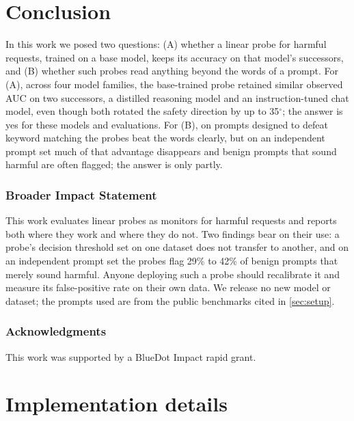 \documentclass[10pt]{article}
\begin{document}
\section{Conclusion}
\label{sec:conclusion}

In this work we posed two questions: (A) whether a linear probe for harmful requests, trained on a base model, keeps its accuracy on that model's successors, and (B) whether such probes read anything beyond the words of a prompt. For (A), across four model families, the base-trained probe retained similar observed AUC on two successors, a distilled reasoning model and an instruction-tuned chat model, even though both rotated the safety direction by up to 35$^\circ$; the answer is yes for these models and evaluations. For (B), on prompts designed to defeat keyword matching the probes beat the words clearly, but on an independent prompt set much of that advantage disappears and benign prompts that sound harmful are often flagged; the answer is only partly.

\subsubsection*{Broader Impact Statement}
This work evaluates linear probes as monitors for harmful requests and reports both where they work and where they do not. Two findings bear on their use: a probe's decision threshold set on one dataset does not transfer to another, and on an independent prompt set the probes flag 29\% to 42\% of benign prompts that merely sound harmful. Anyone deploying such a probe should recalibrate it and measure its false-positive rate on their own data. We release no new model or dataset; the prompts used are from the public benchmarks cited in \cref{sec:setup}.

\subsubsection*{Acknowledgments}
This work was supported by a BlueDot Impact rapid grant.




\appendix
\renewcommand{\thefigure}{\thesection.\arabic{figure}}
\renewcommand{\thetable}{\thesection.\arabic{table}}
\setcounter{figure}{0}\setcounter{table}{0}

\section{Implementation details}
\label{app:details}
\end{document}
